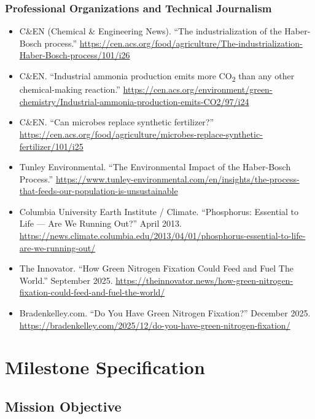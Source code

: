 \documentclass[11pt,letterpaper]{article}
\newcommand{\stageheader}[2]{%
  \noindent\colorbox{#2}{\makebox[\textwidth][l]{%
    \textcolor{white}{\bfseries\sffamily\hspace{6pt}#1\hspace{6pt}}}}%
  \vspace{0.5em}\par%
}
\begin{document}
\subsubsection{Professional Organizations and Technical Journalism}
\begin{itemize}[leftmargin=1.5em]
  \item C\&EN (Chemical \& Engineering News). ``The industrialization of the Haber-Bosch process.'' \url{https://cen.acs.org/food/agriculture/The-industrialization-Haber-Bosch-process/101/i26}
  \item C\&EN. ``Industrial ammonia production emits more CO\textsubscript{2} than any other chemical-making reaction.'' \url{https://cen.acs.org/environment/green-chemistry/Industrial-ammonia-production-emits-CO2/97/i24}
  \item C\&EN. ``Can microbes replace synthetic fertilizer?'' \url{https://cen.acs.org/food/agriculture/microbes-replace-synthetic-fertilizer/101/i25}
  \item Tunley Environmental. ``The Environmental Impact of the Haber-Bosch Process.'' \url{https://www.tunley-environmental.com/en/insights/the-process-that-feeds-our-population-is-unsustainable}
  \item Columbia University Earth Institute / Climate. ``Phosphorus: Essential to Life --- Are We Running Out?'' April 2013. \url{https://news.climate.columbia.edu/2013/04/01/phosphorus-essential-to-life-are-we-running-out/}
  \item The Innovator. ``How Green Nitrogen Fixation Could Feed and Fuel The World.'' September 2025. \url{https://theinnovator.news/how-green-nitrogen-fixation-could-feed-and-fuel-the-world/}
  \item Bradenkelley.com. ``Do You Have Green Nitrogen Fixation?'' December 2025. \url{https://bradenkelley.com/2025/12/do-you-have-green-nitrogen-fixation/}
\end{itemize}

\newpage

\stageheader{STAGE 3 --- MISSION PACKAGE}{tertiary}

\section{Milestone Specification}

\subsection{Mission Objective}
\end{document}
